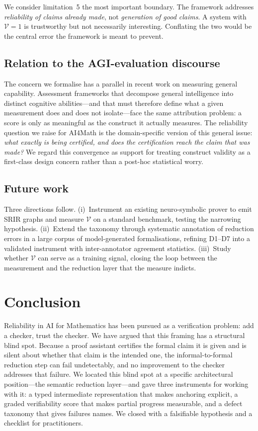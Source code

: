\documentclass[11pt,a4paper]{article}
\theoremstyle{definition}
\theoremstyle{plain}
\theoremstyle{remark}
\newcommand{\V}{\mathcal{V}}           %
\begin{document}
We consider limitation~5 the most important boundary. The framework addresses
\emph{reliability of claims already made}, not \emph{generation of good
claims}. A system with $\V = 1$ is trustworthy but not necessarily interesting.
Conflating the two would be the central error the framework is meant to prevent.

\subsection{Relation to the AGI-evaluation discourse}

The concern we formalise has a parallel in recent work on measuring general
capability. Assessment frameworks that decompose general intelligence into
distinct cognitive abilities---and that must therefore define what a given
measurement does and does not isolate---face the same attribution problem: a
score is only as meaningful as the construct it actually measures. The
reliability question we raise for AI4Math is the domain-specific version of this
general issue: \emph{what exactly is being certified, and does the certification
reach the claim that was made?} We regard this convergence as support for
treating construct validity as a first-class design concern rather than a
post-hoc statistical worry.

\subsection{Future work}

Three directions follow. (i)~Instrument an existing neuro-symbolic prover to
emit SRIR graphs and measure $\V$ on a standard benchmark, testing the narrowing
hypothesis. (ii)~Extend the taxonomy through systematic annotation of reduction
errors in a large corpus of model-generated formalisations, refining D1--D7 into
a validated instrument with inter-annotator agreement statistics. (iii)~Study
whether $\V$ can serve as a training signal, closing the loop between the
measurement and the reduction layer that the measure indicts.

\section{Conclusion}
\label{sec:conclusion}

Reliability in AI for Mathematics has been pursued as a verification problem:
add a checker, trust the checker. We have argued that this framing has a
structural blind spot. Because a proof assistant certifies the formal claim it
is given and is silent about whether that claim is the intended one, the
informal-to-formal reduction step can fail undetectably, and no improvement to
the checker addresses that failure. We located this blind spot at a specific
architectural position---the semantic reduction layer---and gave three
instruments for working with it: a typed intermediate representation that makes
anchoring explicit, a graded verifiability score that makes partial progress
measurable, and a defect taxonomy that gives failures names. We closed with a
falsifiable hypothesis and a checklist for practitioners.
\end{document}
